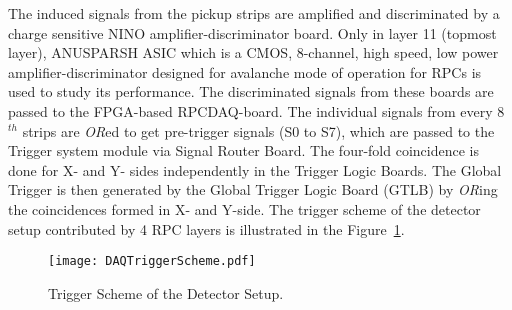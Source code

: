The induced signals from the pickup strips are amplified and
discriminated by a charge sensitive NINO\cite{nino}
amplifier-discriminator board. Only in layer 11 (topmost layer),
ANUSPARSH ASIC\cite{anusp} which is a CMOS, 8-channel,
high speed, low power amplifier-discriminator designed for
avalanche mode of operation for RPCs is used to study its performance.
The discriminated signals from these boards are passed
to the FPGA-based RPCDAQ-board.
The individual signals from every 8$^{th}$ strips are \emph{OR}ed
to get pre-trigger signals (S0 to S7), which are passed to the Trigger
system module via Signal Router Board. The four-fold coincidence is done
for X- and Y- sides independently in the Trigger Logic Boards.
The Global Trigger is then generated by the Global Trigger Logic Board
(GTLB) by \textit{OR}ing the coincidences formed in X- and Y-side.
The trigger scheme of the detector setup contributed by 4 RPC layers is
illustrated in the Figure~\ref{fig:trigger}.
\begin{figure}[h]
  \texttt{[image: DAQTriggerScheme.pdf]} 
  \caption{Trigger Scheme of the Detector Setup.}
  \label{fig:trigger}
\end{figure}

